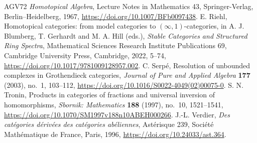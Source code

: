 \documentclass[10pt,a4paper]{amsart}
\theoremstyle{plain}
\theoremstyle{definition}
\theoremstyle{remark}
\begin{document}
\begin{thebibliography}{AGV72}
  \emph{Homotopical Algebra},
  Lecture Notes in Mathematics 43, Springer-Verlag, Berlin--Heidelberg, 1967,
  \url{https://doi.org/10.1007/BFb0097438}.
  E. Riehl,
  Homotopical categories: from model categories to $(\infty,1)$-categories,
  in A. J. Blumberg, T. Gerhardt and M. A. Hill (eds.),
  \emph{Stable Categories and Structured Ring Spectra},
  Mathematical Sciences Research Institute Publications 69,
  Cambridge University Press, Cambridge, 2022, 5--74,
  \url{https://doi.org/10.1017/9781009128957.002}.
  C. Serp\'e,
  Resolution of unbounded complexes in Grothendieck categories,
  \emph{Journal of Pure and Applied Algebra} \textbf{177} (2003), no.~1, 103--112,
  \url{https://doi.org/10.1016/S0022-4049(02)00075-0}.
  S. N. Tronin,
  Products in categories of fractions and universal inversion of homomorphisms,
  \emph{Sbornik: Mathematics} \textbf{188} (1997), no.~10, 1521--1541,
  \url{https://doi.org/10.1070/SM1997v188n10ABEH000266}.
  J.-L. Verdier,
  \emph{Des cat\'egories d\'eriv\'ees des cat\'egories ab\'eliennes},
  Ast\'erisque 239, Soci\'et\'e Math\'ematique de France, Paris, 1996,
  \url{https://doi.org/10.24033/ast.364}.
\end{thebibliography}
\end{document}
